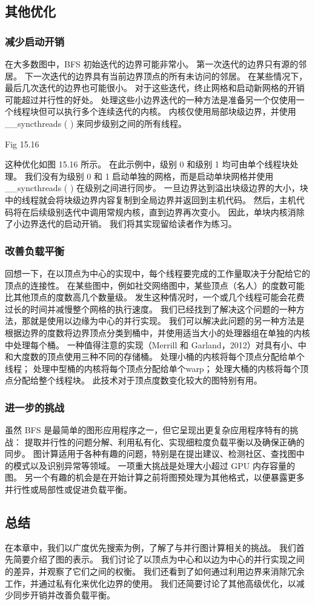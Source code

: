 \subsection{其他优化}
\subsubsection{减少启动开销}
在大多数图中，BFS 初始迭代的边界可能非常小。 第一次迭代的边界只有源的邻居。 
下一次迭代的边界具有当前边界顶点的所有未访问的邻居。 在某些情况下，最后几次迭代的边界也可能很小。 
对于这些迭代，终止网格和启动新网格的开销可能超过并行性的好处。 
处理这些小边界迭代的一种方法是准备另一个仅使用一个线程块但可以执行多个连续迭代的内核。 
内核仅使用局部块级边界，并使用 \_\_syncthreads ( ) 来同步级别之间的所有线程。

{\color{red} Fig 15.16}

这种优化如图 15.16 所示。 在此示例中，级别 0 和级别 1 均可由单个线程块处理。 
我们没有为级别 0 和 1 启动单独的网格，而是启动单块网格并使用 \_\_syncthreads ( ) 在级别之间进行同步。 
一旦边界达到溢出块级边界的大小，块中的线程就会将块级边界内容复制到全局边界并返回到主机代码。 
然后，主机代码将在后续级别迭代中调用常规内核，直到边界再次变小。 
因此，单块内核消除了小边界迭代的启动开销。 我们将其实现留给读者作为练习。

\subsubsection{改善负载平衡}
回想一下，在以顶点为中心的实现中，每个线程要完成的工作量取决于分配给它的顶点的连接性。 
在某些图中，例如社交网络图中，某些顶点（名人）的度数可能比其他顶点的度数高几个数量级。 
发生这种情况时，一个或几个线程可能会花费过长的时间并减慢整个网格的执行速度。 
我们已经找到了解决这个问题的一种方法，那就是使用以边缘为中心的并行实现。 
我们可以解决此问题的另一种方法是根据边界的度数将边界顶点分类到桶中，并使用适当大小的处理器组在单独的内核中处理每个桶。 
一种值得注意的实现（Merrill 和 Garland，2012）对具有小、中和大度数的顶点使用三种不同的存储桶。 
处理小桶的内核将每个顶点分配给单个线程； 处理中型桶的内核将每个顶点分配给单个warp； 
处理大桶的内核将每个顶点分配给整个线程块。 此技术对于顶点度数变化较大的图特别有用。

\subsubsection{进一步的挑战}
虽然 BFS 是最简单的图形应用程序之一，但它呈现出更复杂应用程序特有的挑战：
提取并行性的问题分解、利用私有化、实现细粒度负载平衡以及确保正确的同步。 
图计算适用于各种有趣的问题，特别是在提出建议、检测社区、查找图中的模式以及识别异常等领域。 
一项重大挑战是处理大小超过 GPU 内存容量的图。 
另一个有趣的机会是在开始计算之前将图预处理为其他格式，以便暴露更多并行性或局部性或促进负载平衡。

\subsection{总结}
在本章中，我们以广度优先搜索为例，了解了与并行图计算相关的挑战。 我们首先简要介绍了图的表示。 
我们讨论了以顶点为中心和以边为中心的并行实现之间的差异，并观察了它们之间的权衡。 
我们还看到了如何通过利用边界来消除冗余工作，并通过私有化来优化边界的使用。 
我们还简要讨论了其他高级优化，以减少同步开销并改善负载平衡。